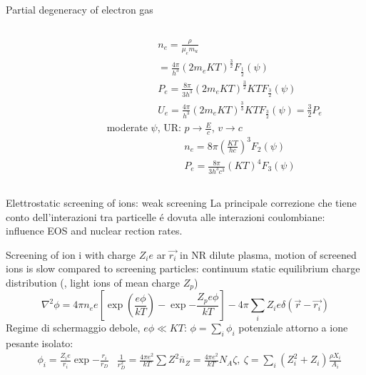 \begin{frame}{Partial degeneracy of electron gas}
\begin{columns}[T]
\begin{column}{0.55\textwidth}
\begin{align*}
            \end{align*}
        \end{column}
        \begin{column}{0.45\textwidth}
            \begin{align*}
                    &n_e=\frac{\rho}{\mu_em_u}\\
                    &=\frac{4\pi}{h^3}(2m_eKT)^{\frac{3}{2}}F_{\frac{1}{2}}(\psi)\tag{moderate $\psi$}\\
                    &P_e=\frac{8\pi}{3h^3}(2m_eKT)^{\frac{3}{2}}KTF_{\frac{3}{2}}(\psi)\\
                    &U_e=\frac{4\pi}{h^3}(2m_eKT)^{\frac{3}{3}}KTF_{\frac{3}{2}}(\psi)=\frac{3}{2}P_e
            \end{align*}
            moderate $\psi$, UR: $p\to \frac{E}{c}$, $v\to c$
            \begin{align*}
                &n_e=8\pi(\frac{KT}{hc})^3F_2(\psi)\\
                &P_e=\frac{8\pi}{3h^3c^3}(KT)^4F_3(\psi)
            \end{align*}
        \end{column}
    \end{columns}
    
\end{frame}
\begin{wordonframe}{Elettrostatic screening of ions: weak screening}
La principale correzione che tiene conto dell'interazioni tra particelle \'e dovuta alle interazioni coulombiane: influence EOS and nuclear rection rates.

Screening of ion i with charge $Z_ie$ ar $\vec{r_i}$ in NR dilute plasma, motion of screened ions is slow compared to screening particles: continuum static equilibrium charge distribution (\Pelectron, light ions of mean charge $Z_p$)
\begin{equation*}
\nabla^2\phi=4\pi n_ee[\exp{(\frac{e\phi}{kT})}-\exp{-\frac{Z_pe\phi}{kT}}]-4\pi\sum_iZ_ie\delta(\vec{r}-\vec{r_i})
\end{equation*}
Regime di schermaggio debole, $e\phi\ll KT$: $\phi=\sum_i\phi_i$ potenziale attorno a ione pesante isolato:
\begin{align*}
&\phi_i=\frac{Z_ie}{r_i}\exp{-\frac{r_i}{r_D}}
&\frac{1}{r_D^2}=\frac{4\pi e^2}{kT}\sum Z^2\overline{n}_Z=\frac{4\pi e^2}{kT}N_A\zeta,\ \zeta=\sum_{i}(Z_i^2+Z_i)\frac{\rho X_i}{A_i}
\end{align*}
\end{wordonframe}

